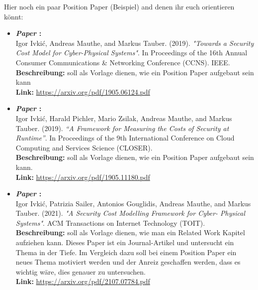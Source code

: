 \vspace{10pt}
Hier noch ein paar Position Paper (Beispiel) and denen ihr euch orientieren könnt:
\begin{itemize}
	\item\textbf{\textit{Paper \cite{ref01}}:} \\
	Igor Ivki\'c, Andreas Mauthe, and Markus Tauber. (2019). 
	\textit{"Towards a Security Cost Model for Cyber-Physical Systems"}. In Proceedings of the 16th Annual Consumer Communications \& Networking Conference (CCNS). 
	IEEE.\\
	\textbf{Beschreibung:} soll als Vorlage dienen, wie ein Position Paper aufgebaut sein kann\\
	\textbf{Link:} \href{https://arxiv.org/pdf/1905.06124.pdf}{https://arxiv.org/pdf/1905.06124.pdf}\\
	\item\textbf{\textit{Paper \cite{ref02}}:} \\
	Igor Ivki\'c, Harald Pichler, Mario Zsilak, Andreas Mauthe, and Markus Tauber. (2019). 
	\textit{“A Framework for Measuring the Costs of Security at Runtime”}. 
	In Proceedings of the 9th International Conference on Cloud Computing and Services Science (CLOSER).\\
	\textbf{Beschreibung:} soll als Vorlage dienen, wie ein Position Paper aufgebaut sein kann. \\
	\textbf{Link:} \href{https://arxiv.org/pdf/1905.11180.pdf}{https://arxiv.org/pdf/1905.11180.pdf}\\
	
	\item\textbf{\textit{Paper \cite{ref03}}:} \\
	Igor Ivki\'c, Patrizia Sailer, Antonios Gouglidis, Andreas Mauthe, and Markus Tauber. (2021).
	\textit{"A Security Cost Modelling Framework for Cyber- Physical Systems"}.
	ACM Transactions on Internet Technology (TOIT).\\
	\textbf{Beschreibung:} soll als Vorlage dienen, wie man ein Related Work Kapitel aufziehen kann. Dieses Paper ist ein Journal-Artikel und untersucht ein Thema in der Tiefe. Im Vergleich dazu soll bei einem Position Paper ein neues Thema motiviert werden und der Anreiz geschaffen werden, dass es wichtig wäre, dies genauer zu untersuchen. \\
	\textbf{Link:} \href{https://arxiv.org/pdf/2107.07784.pdf}{https://arxiv.org/pdf/2107.07784.pdf}\\
\end{itemize}